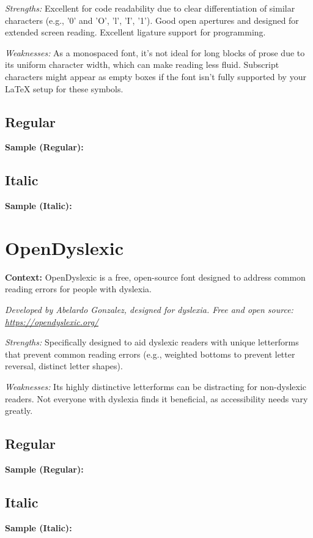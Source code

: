 \begin{raggedright}
\emph{Strengths:} Excellent for code readability due to clear differentiation of similar characters (e.g., '0' and 'O', 'l', 'I', '1'). Good open apertures and designed for extended screen reading. Excellent ligature support for programming.

\emph{Weaknesses:} As a monospaced font, it's not ideal for long blocks of prose due to its uniform character width, which can make reading less fluid. Subscript characters might appear as empty boxes if the font isn't fully supported by your LaTeX setup for these symbols.

\subsection{Regular}
\noindent\textbf{Sample (Regular):}
\FontSample{\jetbrainsmonofont}

\subsection{Italic}
\noindent\textbf{Sample (Italic):}
\FontSample{{\jetbrainsmonofont\itshape}}
\end{raggedright}




\pagebreak
\section{OpenDyslexic}\label{sec:opendyslexic}
\noindent
\textbf{Context:} OpenDyslexic is a free, open-source font designed to address common reading errors for people with dyslexia.

\emph{Developed by Abelardo Gonzalez, designed for dyslexia. Free and open source: \url{https://opendyslexic.org/}}
\begin{raggedright}
\emph{Strengths:} Specifically designed to aid dyslexic readers with unique letterforms that prevent common reading errors (e.g., weighted bottoms to prevent letter reversal, distinct letter shapes).

\emph{Weaknesses:} Its highly distinctive letterforms can be distracting for non-dyslexic readers. Not everyone with dyslexia finds it beneficial, as accessibility needs vary greatly.

\subsection{Regular}
\noindent\textbf{Sample (Regular):}
\FontSample{\opendyslexicfont}

\subsection{Italic}
\noindent\textbf{Sample (Italic):}
\FontSample{{\opendyslexicfont\itshape}}
\end{raggedright}


